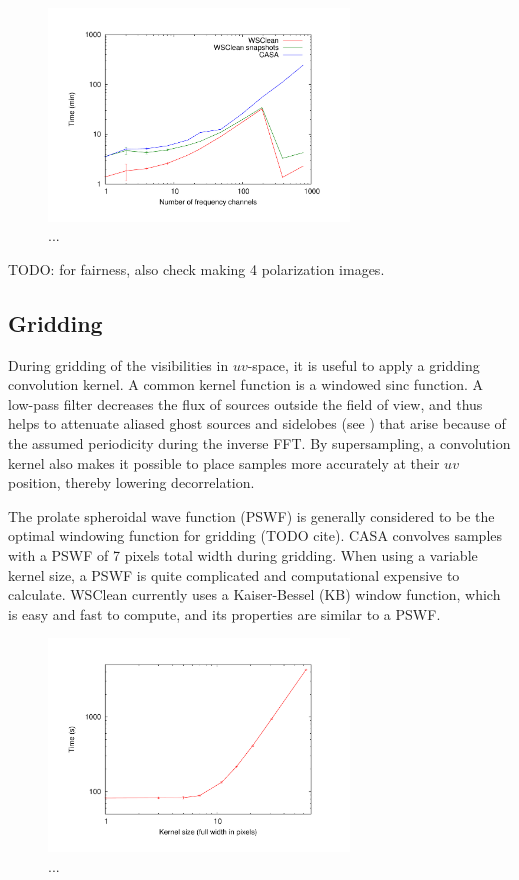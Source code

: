 \documentclass[useAMS,usenatbib]{mn2e}
\begin{document}
\begin{figure}
\begin{center}
\includegraphics[width=8cm]{img/benchmark-channels/channels}
\caption{...}
\label{fig:timing-channels}
\end{center}
\end{figure}

TODO: for fairness, also check making 4 polarization images.

\subsection{Gridding} \label{sec:gridding}
During gridding of the visibilities in $uv$-space, it is useful to apply a gridding convolution kernel. A common kernel function is a windowed sinc function. A low-pass filter decreases the flux of sources outside the field of view, and thus helps to attenuate aliased ghost sources and sidelobes (see \citealt{post-correlation-filtering}) that arise because of the assumed periodicity during the inverse FFT. By supersampling, a convolution kernel also makes it possible to place samples more accurately at their $uv$ position, thereby lowering decorrelation.

The prolate spheroidal wave function (PSWF) is generally considered to be the optimal windowing function for gridding (TODO cite). CASA convolves samples with a PSWF of 7 pixels total width during gridding. When using a variable kernel size, a PSWF is quite complicated and computational expensive to calculate. WSClean currently uses a Kaiser-Bessel (KB) window function, which is easy and fast to compute, and its properties are similar to a PSWF.

\begin{figure}
\begin{center}
\includegraphics[width=8cm]{img/benchmark-kernelsize/kernel}
\caption{...}
\label{fig:timing-kernelsize}
\end{center}
\end{figure}
\end{document}
